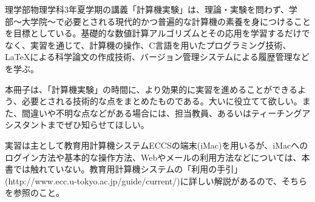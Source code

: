 
理学部物理学科3年夏学期の講義「計算機実験」は、理論・実験を問わず、学部〜大学院〜で必要とされる現代的かつ普遍的な計算機の素養を身につけることを目標としている。基礎的な数値計算アルゴリズムとその応用を学習するだけでなく、実習を通じて、計算機の操作、C言語を用いたプログラミング技術、\LaTeX による科学論文の作成技術、バージョン管理システムによる履歴管理などを学ぶ。

本冊子は、「計算機実験」の時間に、より効果的に実習を進めることができるよう、必要とされる技術的な点をまとめたものである。大いに役立てて欲しい。また、間違いや不明な点などがある場合には、担当教員、あるいはティーチングアシスタントまでぜひ知らせてほしい。

実習は主として教育用計算機システムECCSの端末(iMac)を用いるが、iMacへのログイン方法や基本的な操作方法、Webやメールの利用方法などについては、本書では触れていない。教育用計算機システムの「利用の手引」(http://www.ecc.u-tokyo.ac.jp/guide/current/)に詳しい解説があるので、そちらを参照のこと。






